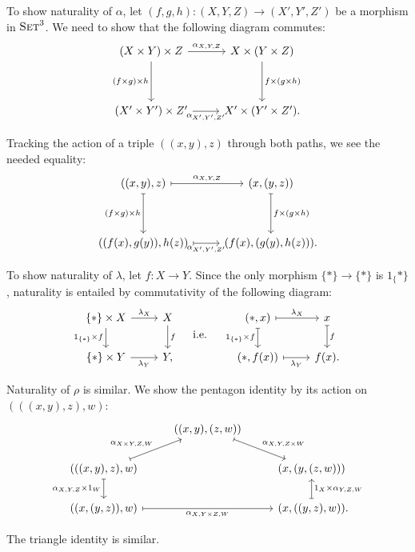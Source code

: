 \begin{ex}
  To show naturality of $\alpha$, let $(f, g, h): (X, Y, Z)\to (X', Y', Z')$ be
  a morphism in ${\textsc{\text{Set}}}^3$. We need to show that the following diagram
  commutes: \[
    \begin{tikzcd}
      (X\times Y)\times Z\ar[r, "\alpha_{X,Y,Z}"]\ar[dd, "(f\times g)\times h"'] &
      X\times(Y\times Z)\ar[dd, "f\times(g\times h)"] \\
      \\
      (X'\times Y')\times Z'\ar[r, "\alpha_{X',Y',Z'}"'] & X'\times(Y'\times Z').
    \end{tikzcd}
  \]

  Tracking the action of a triple $((x, y), z)$ through both paths, we see the
  needed equality: \[
    \begin{tikzcd}
      ((x, y), z)\ar[r, mapsto, "\alpha_{X,Y,Z}"]\ar[dd, mapsto, "(f\times g)\times h"'] & (x, (y, z))\ar[dd, mapsto, "f\times(g\times h)"] \\
      \\
      ((f(x), g(y)), h(z))\ar[r, mapsto, "\alpha_{X',Y',Z'}"'] & (f(x), (g(y), h(z))).
    \end{tikzcd}
  \]

  To show naturality of $\lambda$, let $f: X\to Y$. Since the only morphism
  $\{*\}\to\{*\}$ is $1_\{*\}$, naturality is entailed by commutativity of the
  following diagram: \[
    \begin{tikzcd}
      \{*\}\times X\ar[r, "\lambda_X"]\ar[d, "1_{\{*\}}\times f"'] & X\ar[d, "f"] \\
      \{*\}\times Y\ar[r, "\lambda_Y"'] & Y,
    \end{tikzcd}
    \quad\text{ i.e. }\quad
    \begin{tikzcd}
      (*, x)\ar[r, mapsto, "\lambda_X"]\ar[d, mapsto, "1_{\{*\}}\times f"'] & x\ar[d, mapsto, "f"] \\
      (*, f(x))\ar[r, mapsto, "\lambda_Y"'] & f(x).
    \end{tikzcd}
  \]

  Naturality of $\rho$ is similar. We show the pentagon identity by its action
  on $(((x, y), z), w)$: \[
		\begin{tikzcd}
			& ((x, y), (z, w)) & \\
      (((x, y), z), w) & & (x, (y, (z, w))) \\
      ((x, (y, z)), w) & & (x, ((y, z), w))\punctuation{.}
			\arrow[mapsto, "\alpha_{X\times Y, Z, W}", from=2-1, to=1-2]
			\arrow[mapsto, "\alpha_{X, Y, Z\times W}", from=1-2, to=2-3]
			\arrow[mapsto, "\alpha_{X, Y, Z}\times 1_W", from=2-1, to=3-1, swap]
			\arrow[mapsto, "1_X\times\alpha_{Y, Z, W}", from=3-3, to=2-3, swap]
			\arrow[mapsto, "\alpha_{X, Y\times Z, W}", from=3-1, to=3-3, swap]
		\end{tikzcd}
  \]

  The triangle identity is similar.
\end{ex}

